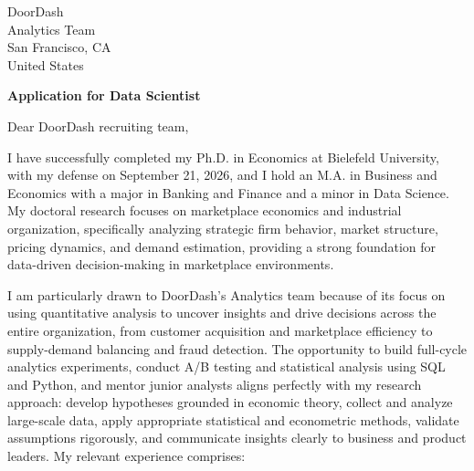 \documentclass[11pt]{article}
\begin{document}
\vspace{0.1cm}

\noindent
DoorDash \\
Analytics Team \\
San Francisco, CA \\
United States

\vspace{0.12cm}

\noindent
\textbf{Application for Data Scientist}

\vspace{0.1cm}

\noindent Dear DoorDash recruiting team,

I have successfully completed my Ph.D. in Economics at Bielefeld University, with my defense on September 21, 2026, 
and I hold an M.A. in Business and Economics with a major in Banking and Finance and a minor in Data Science. 
My doctoral research focuses on marketplace economics and industrial organization, 
specifically analyzing strategic firm behavior, market structure, pricing dynamics, and demand estimation, 
providing a strong foundation for data-driven decision-making in marketplace environments.

I am particularly drawn to DoorDash's Analytics team because of its focus on using quantitative analysis to uncover insights and drive decisions across the entire organization,
from customer acquisition and marketplace efficiency to supply-demand balancing and fraud detection. 
The opportunity to build full-cycle analytics experiments, conduct A/B testing and statistical analysis using SQL and Python, and mentor junior analysts aligns perfectly with my research approach: 
develop hypotheses grounded in economic theory, collect and analyze large-scale data, apply appropriate statistical and econometric methods, 
validate assumptions rigorously, and communicate insights clearly to business and product leaders.
My relevant experience comprises:
\end{document}
